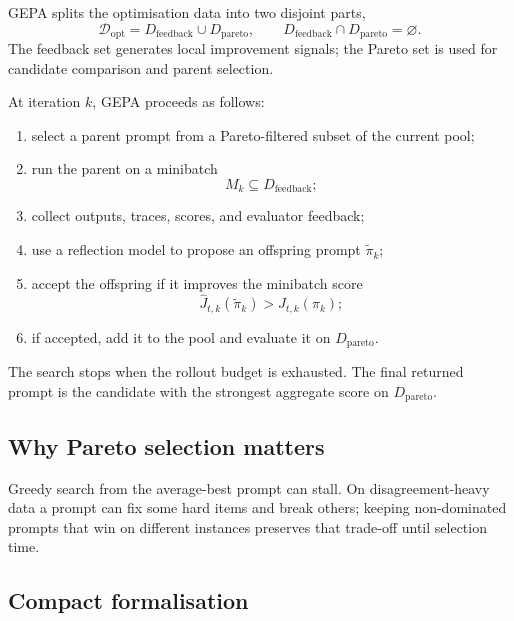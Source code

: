 GEPA splits the optimisation data into two disjoint parts,
\begin{equation}
    \mathcal{D}_{\mathrm{opt}}
    =
    D_{\mathrm{feedback}}\cup D_{\mathrm{pareto}},
    \qquad
    D_{\mathrm{feedback}}\cap D_{\mathrm{pareto}}=\varnothing.
\end{equation}
The feedback set generates local improvement signals; the Pareto set is used for candidate comparison and parent selection.

At iteration \(k\), GEPA proceeds as follows:
\begin{enumerate}
    \item select a parent prompt from a Pareto-filtered subset of the current pool;
    \item run the parent on a minibatch
    \begin{equation}
        M_k \subseteq D_{\mathrm{feedback}};
    \end{equation}
    \item collect outputs, traces, scores, and evaluator feedback;
    \item use a reflection model to propose an offspring prompt \(\widetilde{\pi}_k\);
    \item accept the offspring if it improves the minibatch score
    \begin{equation}
        \widehat{J}_{t,k}(\widetilde{\pi}_k)>\widehat{J}_{t,k}(\pi_k);
    \end{equation}
    \item if accepted, add it to the pool and evaluate it on \(D_{\mathrm{pareto}}\).
\end{enumerate}

The search stops when the rollout budget is exhausted. The final returned prompt is the candidate with the strongest aggregate score on \(D_{\mathrm{pareto}}\).

\subsection{Why Pareto selection matters}

Greedy search from the average-best prompt can stall. On disagreement-heavy data a prompt can fix some hard items and break others; keeping non-dominated prompts that win on different instances preserves that trade-off until selection time.

\subsection{Compact formalisation}


